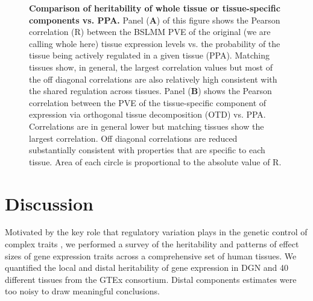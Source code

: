 \documentclass[10pt,letterpaper]{article}
\begin{document}



\begin{figure}[H]
\caption{{\bf Comparison of heritability of whole tissue or tissue-specific components vs. PPA.} 
Panel (\textbf{A}) of this figure shows the Pearson correlation (R) between the BSLMM PVE of the original (we are calling whole here) tissue expression levels vs. the probability of the tissue being actively regulated in a given tissue (PPA). Matching tissues show, in general, the largest correlation values but most of the off diagonal correlations are also relatively high consistent with the shared regulation across tissues. 
Panel (\textbf{B}) shows the Pearson correlation between the PVE of the tissue-specific component of expression via orthogonal tissue decomposition (OTD) vs. PPA. Correlations are in general lower but matching tissues show the largest correlation. Off diagonal correlations are reduced substantially consistent with properties that are specific to each tissue. 
Area of each circle is proportional to the absolute value of R.
}
\label{fig-corrplot}
\end{figure}



\section*{Discussion}
Motivated by the key role that regulatory variation plays in the genetic control of complex traits \cite{Nicolae_2010,Nica_2010,Gusev_2014}, we performed a survey of the heritability and patterns of effect sizes of gene expression traits across a comprehensive set of human tissues. We quantified the local and distal heritability of gene expression in DGN and 40 different tissues from the GTEx consortium. Distal components estimates were too noisy to draw meaningful conclusions.
\end{document}
